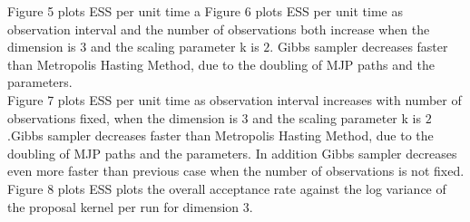 Figure 5 plots ESS per unit time a
Figure 6 plots ESS per unit time as observation interval and the number of observations both increase when the dimension is $3$ and the scaling parameter k is $2$. Gibbs sampler decreases faster than Metropolis Hasting Method, due to the doubling of MJP paths and the parameters. \\

Figure 7 plots ESS per unit time as observation interval increases with number of observations fixed, when the dimension is $3$ and the scaling parameter k is $2$.Gibbs sampler decreases faster than Metropolis Hasting Method, due to the doubling of MJP paths and the parameters. In addition Gibbs sampler decreases even more faster than previous case when the number of observations is not fixed. \\

Figure 8 plots ESS plots the overall  acceptance rate against the log variance of the proposal kernel per run for dimension $3$. 


